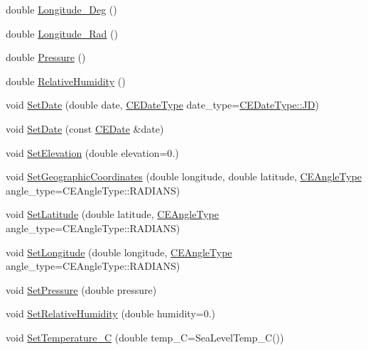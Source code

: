 \begin{DoxyCompactItemize}
double \hyperlink{class_c_e_observer_aae554303d7f4feb13359eb1b1730063c}{Longitude\+\_\+\+Deg} ()
\item 
double \hyperlink{class_c_e_observer_aecd18686fb2bcdc9ddaa519cf48c4428}{Longitude\+\_\+\+Rad} ()
\item 
double \hyperlink{class_c_e_observer_a683ab4983c7a0b5ec59b23a61d3d42c6}{Pressure} ()
\item 
double \hyperlink{class_c_e_observer_a5a99d5f72b2bb09dd49d477c65351e0c}{Relative\+Humidity} ()
\item 
void \hyperlink{class_c_e_observer_ac164ff5c5b8ad0026acda27f2657c560}{Set\+Date} (double date, \hyperlink{_c_e_date_8h_aa6b826beca26b0712061a4afc5ad7746}{C\+E\+Date\+Type} date\+\_\+type=\hyperlink{_c_e_date_8h_aa6b826beca26b0712061a4afc5ad7746aabf8d7515962e526421842e8456798cc}{C\+E\+Date\+Type\+::\+J\+D})
\item 
void \hyperlink{class_c_e_observer_ac04674ffc9afd7313fa9fcec46ad84b5}{Set\+Date} (const \hyperlink{class_c_e_date}{C\+E\+Date} \&date)
\item 
void \hyperlink{class_c_e_observer_a1165de1f35375064ee9bae389c9bc9c2}{Set\+Elevation} (double elevation=0.)
\item 
void \hyperlink{class_c_e_observer_a4c06185db92f0f087467500427b04cb5}{Set\+Geographic\+Coordinates} (double longitude, double latitude, \hyperlink{namespace_cpp_ephem_a9a974f6ccf329e8cb5f9208b725f15ef}{C\+E\+Angle\+Type} angle\+\_\+type=C\+E\+Angle\+Type\+::\+R\+A\+D\+I\+A\+N\+S)
\item 
void \hyperlink{class_c_e_observer_a11e59cdef354a6663c957170032699d8}{Set\+Latitude} (double latitude, \hyperlink{namespace_cpp_ephem_a9a974f6ccf329e8cb5f9208b725f15ef}{C\+E\+Angle\+Type} angle\+\_\+type=C\+E\+Angle\+Type\+::\+R\+A\+D\+I\+A\+N\+S)
\item 
void \hyperlink{class_c_e_observer_a40e741466ce87863ec15ca61a8a37ab9}{Set\+Longitude} (double longitude, \hyperlink{namespace_cpp_ephem_a9a974f6ccf329e8cb5f9208b725f15ef}{C\+E\+Angle\+Type} angle\+\_\+type=C\+E\+Angle\+Type\+::\+R\+A\+D\+I\+A\+N\+S)
\item 
void \hyperlink{class_c_e_observer_a2617ccc51969fc2dd67391980df74536}{Set\+Pressure} (double pressure)
\item 
void \hyperlink{class_c_e_observer_ad08a91ef1fa3734b181f6ac5327d5327}{Set\+Relative\+Humidity} (double humidity=0.)
\item 
void \hyperlink{class_c_e_observer_adc07bc172149ebd37ec7deb2f4bc512a}{Set\+Temperature\+\_\+\+C} (double temp\+\_\+\+C=Sea\+Level\+Temp\+\_\+\+C())

\end{DoxyCompactItemize}
